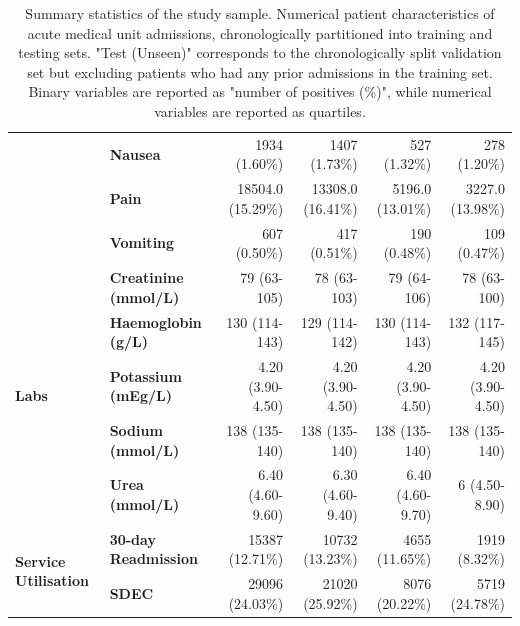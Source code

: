 \documentclass[fleqn,10pt]{wlscirep}
\begin{document}
\begin{table}[htbp]
\begin{tabular}{llrrrr}
                                                                           & \textbf{Nausea}                & 1934 (1.60\%)     & 1407 (1.73\%)     & 527 (1.32\%)     & 278 (1.20\%)     \\
                                                                           & \textbf{Pain}                  & 18504.0 (15.29\%) & 13308.0 (16.41\%) & 5196.0 (13.01\%) & 3227.0 (13.98\%) \\
                                                                           & \textbf{Vomiting}              & 607 (0.50\%)      & 417 (0.51\%)      & 190 (0.48\%)     & 109 (0.47\%)     \\
        \cline{1-6}
        \multirow{5}{*}{\textbf{Labs}}                                     & \textbf{Creatinine (mmol/L)}   & 79 (63-105)       & 78 (63-103)       & 79 (64-106)      & 78 (63-100)      \\
                                                                           & \textbf{Haemoglobin (g/L)}     & 130 (114-143)     & 129 (114-142)     & 130 (114-143)    & 132 (117-145)    \\
                                                                           & \textbf{Potassium (mEg/L)}     & 4.20 (3.90-4.50)  & 4.20 (3.90-4.50)  & 4.20 (3.90-4.50) & 4.20 (3.90-4.50) \\
                                                                           & \textbf{Sodium (mmol/L)}       & 138 (135-140)     & 138 (135-140)     & 138 (135-140)    & 138 (135-140)    \\
                                                                           & \textbf{Urea (mmol/L)}         & 6.40 (4.60-9.60)  & 6.30 (4.60-9.40)  & 6.40 (4.60-9.70) & 6 (4.50-8.90)    \\
        \cline{1-6}
        \multirow{2}{2cm}{\textbf{Service Utilisation}}                    & \textbf{30-day Readmission}    & 15387 (12.71\%)   & 10732 (13.23\%)   & 4655 (11.65\%)   & 1919 (8.32\%)    \\
                                                                           & \textbf{SDEC}                  & 29096 (24.03\%)   & 21020 (25.92\%)   & 8076 (20.22\%)   & 5719 (24.78\%)   \\
        \bottomrule
    \end{tabular}

    \caption{\label{tab:data_summary} Summary statistics of the study sample. Numerical patient characteristics of acute medical unit admissions, chronologically partitioned into training and testing sets. "Test (Unseen)" corresponds to the chronologically split validation set but excluding patients who had any prior admissions in the training set. Binary variables are reported as "number of positives (\%)", while numerical variables are reported as quartiles.}
\end{table}
\end{document}
